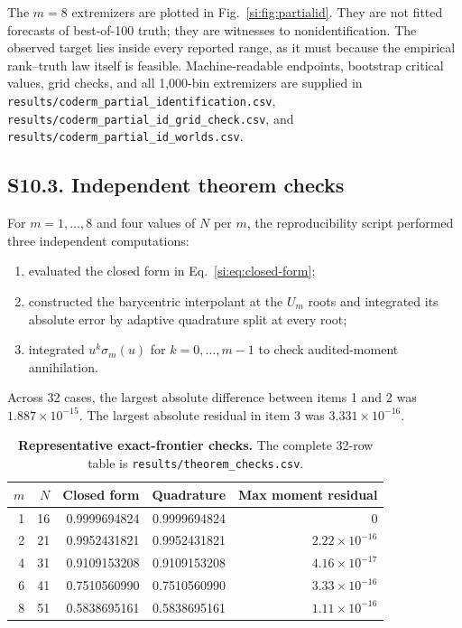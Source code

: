 The $m=8$ extremizers are plotted in Fig.~\ref{si:fig:partialid}. They are not fitted forecasts of best-of-100 truth; they are witnesses to nonidentification. The observed target lies inside every reported range, as it must because the empirical rank--truth law itself is feasible. Machine-readable endpoints, bootstrap critical values, grid checks, and all 1,000-bin extremizers are supplied in \texttt{results/coderm\_partial\_identification.csv}, \texttt{results/coderm\_partial\_id\_grid\_check.csv}, and \texttt{results/coderm\_partial\_id\_worlds.csv}.

\subsection*{S10.3. Independent theorem checks}

For $m=1,\ldots,8$ and four values of $N$ per $m$, the reproducibility script performed three independent computations:
\begin{enumerate}
\item evaluated the closed form in Eq.~\ref{si:eq:closed-form};
\item constructed the barycentric interpolant at the $U_m$ roots and integrated its absolute error by adaptive quadrature split at every root;
\item integrated $u^k\sigma_m(u)$ for $k=0,\ldots,m-1$ to check audited-moment annihilation.
\end{enumerate}
Across 32 cases, the largest absolute difference between items 1 and 2 was $1.887\times10^{-15}$. The largest absolute residual in item 3 was $3.331\times10^{-16}$.

\begin{table}[h]
\centering
\caption{\textbf{Representative exact-frontier checks.} The complete 32-row table is \texttt{results/theorem\_checks.csv}.}
\label{si:tab:checks}
\begin{tabular}{rrrrr}
\toprule
$m$ & $N$ & Closed form & Quadrature & Max moment residual \\
\midrule
1 & 16 & 0.9999694824 & 0.9999694824 & 0 \\
2 & 21 & 0.9952431821 & 0.9952431821 & $2.22\times10^{-16}$ \\
4 & 31 & 0.9109153208 & 0.9109153208 & $4.16\times10^{-17}$ \\
6 & 41 & 0.7510560990 & 0.7510560990 & $3.33\times10^{-16}$ \\
8 & 51 & 0.5838695161 & 0.5838695161 & $1.11\times10^{-16}$ \\
\bottomrule
\end{tabular}
\end{table}

